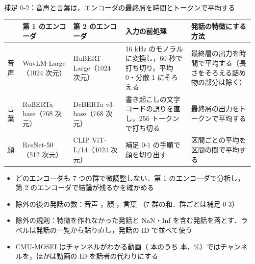 \begin{frame}{補足 0-2：音声と言葉は，エンコーダの最終層を時間とトークンで平均する}
  \vspace{-0.2em}
  \centering\scriptsize
  \setlength{\tabcolsep}{5pt}
  \renewcommand{\arraystretch}{1.08}
  \begin{tabularx}{\textwidth}{@{}l l l X X@{}}
    \toprule
    & 第 1 のエンコーダ & 第 2 のエンコーダ & 入力の前処理 & 発話の特徴にする方法 \\
    \midrule
    音声 & WavLM-Large（1024 次元） & HuBERT-Large（1024 次元） & 16 kHz のモノラルに変換し，60 秒で打ち切り，平均 0・分散 1 にそろえる & 最終層の出力を時間で平均する（長さをそろえる詰め物の部分は除く） \\
    言葉 & RoBERTa-base（768 次元） & DeBERTa-v3-base（768 次元） & 書き起こしの文字コードの誤りを直し，256 トークンで打ち切る & 最終層の出力をトークンで平均する \\
    顔 & ResNet-50（512 次元） & CLIP ViT-L/14（1024 次元） & 補足 0-1 の手順で顔を切り出す & 区間ごとの平均を区間の間で平均する \\
    \bottomrule
  \end{tabularx}\par
  \vspace{0.3em}\raggedright
  \begin{itemize}\scriptsize\setlength{\itemsep}{2pt}
    \item どのエンコーダも 7 つの群で微調整しない．第 1 のエンコーダで分析し，第 2 のエンコーダで結論が残るかを確かめる
    \item 除外の後の発話の数：音声 ，顔 ，言葉 （7 群の和．群ごとは補足 0-3）
    \item 除外の規則：特徴を作れなかった発話と NaN・Inf を含む発話を落とす．ラベルは発話の一覧から貼り直し，発話の ID で並べて使う
    \item CMU-MOSEI はチャンネルがわかる動画（ 本のうち  本，\%）ではチャンネルを，ほかは動画の ID を話者の代わりにする
  \end{itemize}
\end{frame}

